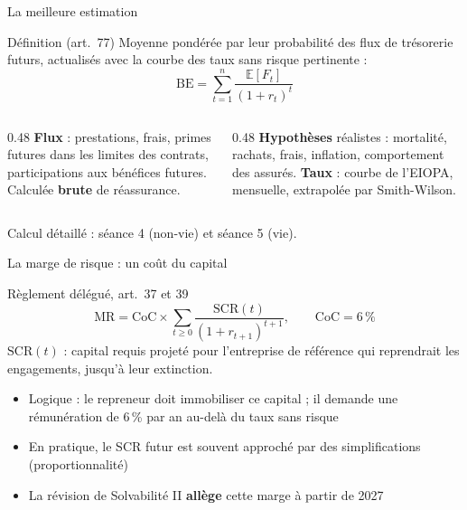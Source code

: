 \documentclass[10pt,aspectratio=169]{beamer}
\newcommand{\BE}{\mathrm{BE}}
\newcommand{\MR}{\mathrm{MR}}
\newcommand{\SCR}{\mathrm{SCR}}
\begin{document}
\begin{frame}{La meilleure estimation}
\begin{block}{Définition (art.~77)}
Moyenne pondérée par leur probabilité des flux de trésorerie futurs, actualisés avec la courbe
des taux sans risque pertinente :
\[ \BE = \sum_{t=1}^{n} \frac{\mathbb{E}[F_t]}{(1+r_t)^t} \]
\end{block}
\begin{columns}[T]
\begin{column}{0.48\textwidth}
\small
\textbf{Flux} : prestations, frais, primes futures dans les limites des contrats, participations
aux bénéfices futures. Calculée \textbf{brute} de réassurance.
\end{column}
\begin{column}{0.48\textwidth}
\small
\textbf{Hypothèses} réalistes : mortalité, rachats, frais, inflation, comportement des assurés.
\textbf{Taux} : courbe de l'EIOPA, mensuelle, extrapolée par Smith-Wilson.
\end{column}
\end{columns}
\vspace{0.2cm}
\begin{center}\small Calcul détaillé : séance 4 (non-vie) et séance 5 (vie).\end{center}
\end{frame}

\begin{frame}{La marge de risque : un coût du capital}
\begin{block}{Règlement délégué, art.~37 et 39}
\[ \MR = \mathrm{CoC} \times \sum_{t \geq 0} \frac{\SCR(t)}{(1+r_{t+1})^{t+1}}, \qquad \mathrm{CoC} = 6\,\% \]
$\SCR(t)$ : capital requis projeté pour l'entreprise de référence qui reprendrait les engagements,
jusqu'à leur extinction.
\end{block}
\begin{itemize}
  \item Logique : le repreneur doit immobiliser ce capital ; il demande une rémunération de 6\,\%
        par an au-delà du taux sans risque
  \item En pratique, le SCR futur est souvent approché par des simplifications (proportionnalité)
  \item La révision de Solvabilité II \textbf{allège} cette marge à partir de 2027
\end{itemize}
\end{frame}
\end{document}
